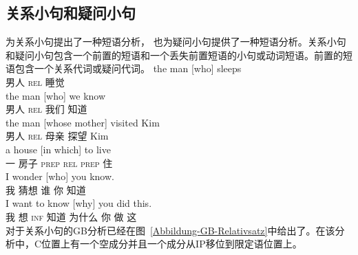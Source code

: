 \begin{exe}
\begin{xlist}[iv.]
\begin{exe}
\begin{xlist}[iv.]
\subsection{关系小句和疑问小句}
\label{Abschnitt-Relativ-Interrogativsaetze}
\mbox{}\citet{Sag97a}为关系小句提出了一种短语分析， \citet{GSag2000a-u}也为疑问小句提供了一种短语分析。关系小句和疑问小句包含一个前置的短语和一个丢失前置短语的小句或动词短语。前置的短语包含一个关系代词或疑问代词。
\eal
\ex
\gll the man [who] sleeps\\
      男人 \spacebr{}\textsc{rel} 睡觉\\
\ex
\gll the man [who] we know\\
      男人 \spacebr{}\textsc{rel} 我们 知道\\
\ex
\gll the man [whose mother] visited Kim\\
      男人 \spacebr{}\textsc{rel} 母亲 探望 Kim\\
\ex
\gll a house [in which] to live\\
     一 房子 \spacebr{}\textsc{prep} \textsc{rel} \textsc{prep} 住\\
\zl
\eal
\ex
\gll I wonder [who] you know.\\
     我 猜想 \spacebr{}谁 你 知道\\
\ex
\gll  I want to know [why] you did this.\\
     我 想 \textsc{inf} 知道 \spacebr{}为什么 你 做 这\\
\zl
对于关系小句的GB分析已经在图~\ref{Abbildung-GB-Relativsatz}中给出了。在该分析中，C位置上有一个空成分并且一个成分从IP移位到限定语位置上。%

\end{xlist}
\end{exe}
\end{xlist}
\end{exe}
